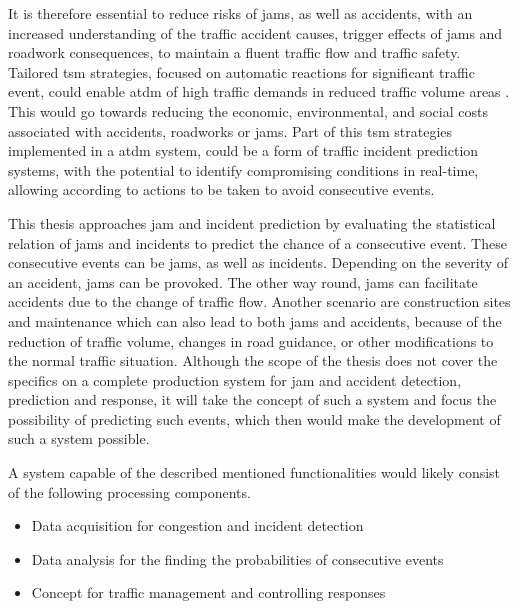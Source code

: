 \documentclass[a4paper,12pt]{report}
\begin{document}
It is therefore essential to reduce risks of \glspl{jam}, as well as accidents, with an increased understanding of the traffic accident causes, trigger effects of \glspl{jam} and roadwork consequences, to maintain a fluent traffic flow and traffic safety. Tailored \acrfull{tsm} strategies, focused on automatic reactions for significant traffic event, could enable \acrfull{atdm} of high traffic demands in reduced traffic volume areas \cite{Tang2019}. This would go towards reducing the economic, environmental, and social costs associated with accidents, roadworks or \glspl{jam}. Part of this \acrshort{tsm} strategies implemented in a \acrshort{atdm} system, could be a form of traffic incident prediction systems, with the potential to identify compromising conditions in real-time, allowing according to actions to be taken to avoid consecutive events. \cite{RetallackOstendorf2019} 

\bigskip

This thesis approaches \gls{jam} and incident prediction by evaluating the statistical relation of \glspl{jam} and incidents to predict the chance of a consecutive event. These consecutive events can be \glspl{jam}, as well as incidents. Depending on the severity of an accident, \glspl{jam} can be provoked. The other way round, \glspl{jam} can facilitate accidents due to the change of traffic flow. Another scenario are construction sites and maintenance which can also lead to both \glspl{jam} and accidents, because of the reduction of traffic volume, changes in road guidance, or other modifications to the normal traffic situation. Although the scope of the thesis does not cover the specifics on a complete production system for \gls{jam} and accident detection, prediction and response, it will take the concept of such a system and focus the possibility of predicting such events, which then would make the development of such a system possible. 

A system capable of the described mentioned functionalities would likely consist of the following processing components.

\begin{itemize}
  \item Data acquisition for congestion and incident detection
  \item Data analysis for the finding the probabilities of consecutive events
  \item Concept for traffic management and controlling responses
\end{itemize}
\end{document}
